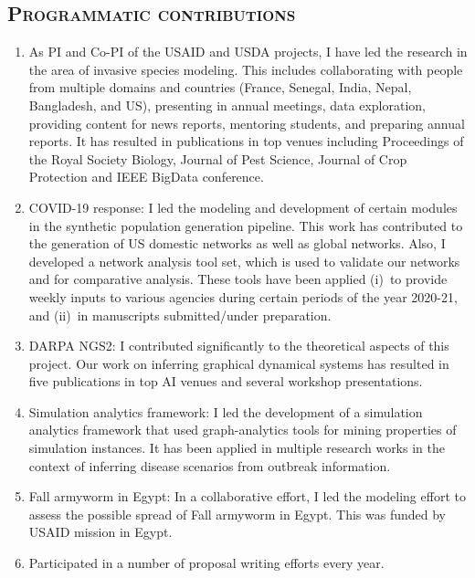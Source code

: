 \documentclass[margin,10pt]{res} %
\begin{document}
\begin{resume}
{\section{\textnormal{\textsc{Programmatic contributions}}}
\begin{enumerate}[$\circ$]
\item As PI and Co-PI of the USAID and USDA projects, I have led the
research in the area of invasive species modeling. This includes
collaborating with people from multiple domains and countries (France,
Senegal, India, Nepal, Bangladesh, and US), presenting in annual meetings,
data exploration, providing content for news reports, mentoring students,
and preparing annual reports. It has resulted in publications in top venues
including Proceedings of the Royal Society Biology, Journal of Pest
Science, Journal of Crop Protection and IEEE BigData conference.
\item COVID-19 response: I led the modeling and development of certain
modules in the synthetic population generation pipeline. This work has
contributed to the generation of US domestic networks as well as global
networks. Also, I developed a network analysis tool set, which is used to
validate our networks and for comparative analysis. These tools have been
applied (i)~to provide weekly inputs to various agencies during certain
periods of the year 2020-21, and (ii)~in manuscripts submitted/under
preparation.
\item DARPA NGS2: I contributed significantly to the theoretical aspects of
this project. Our work on inferring graphical dynamical systems has
resulted in five publications in top AI venues and several workshop
presentations.
\item Simulation analytics framework: I led the development of a simulation
analytics framework that used graph-analytics tools for mining properties
of simulation instances. It has been applied in multiple research works in
the context of inferring disease scenarios from outbreak information.
\item Fall armyworm in Egypt: In a collaborative effort, I led the modeling
effort to assess the possible spread of Fall armyworm in Egypt. This was
funded by USAID mission in Egypt.
\item Participated in a number of proposal writing efforts every year.
\end{enumerate}

}
\end{resume}
\end{document}
